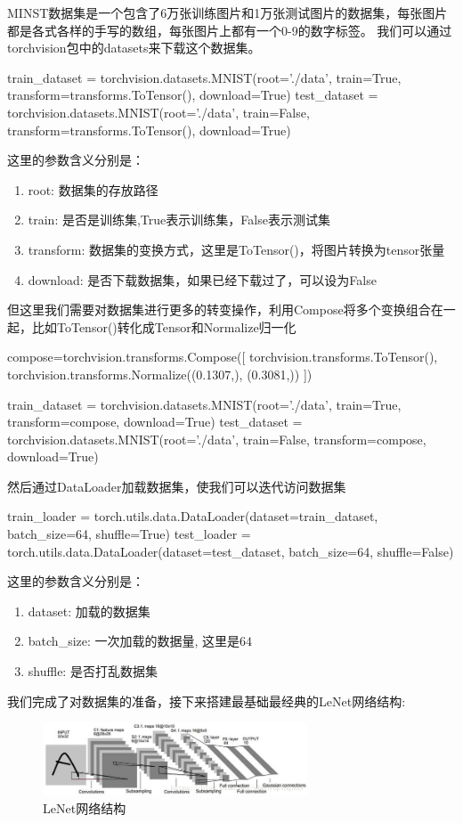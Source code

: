 MINST数据集是一个包含了6万张训练图片和1万张测试图片的数据集，每张图片都是各式各样的手写的数组，每张图片上都有一个0-9的数字标签。
我们可以通过torchvision包中的datasets来下载这个数据集。
\begin{tpython}
    train_dataset = torchvision.datasets.MNIST(root='./data', train=True, transform=transforms.ToTensor(), download=True)
    test_dataset = torchvision.datasets.MNIST(root='./data', train=False, transform=transforms.ToTensor(), download=True)
\end{tpython}
这里的参数含义分别是：
\begin{enumerate}
    \item root: 数据集的存放路径
    \item train: 是否是训练集,True表示训练集，False表示测试集
    \item transform: 数据集的变换方式，这里是ToTensor()，将图片转换为tensor张量
    \item download: 是否下载数据集，如果已经下载过了，可以设为False
\end{enumerate}

但这里我们需要对数据集进行更多的转变操作，利用Compose将多个变换组合在一起，比如ToTensor()转化成Tensor和Normalize归一化
\begin{tpython}
    compose=torchvision.transforms.Compose([
        torchvision.transforms.ToTensor(),
        torchvision.transforms.Normalize((0.1307,), (0.3081,))
    ])

    train_dataset = torchvision.datasets.MNIST(root='./data', train=True, transform=compose, download=True)
    test_dataset = torchvision.datasets.MNIST(root='./data', train=False, transform=compose, download=True)
\end{tpython}

然后通过DataLoader加载数据集，使我们可以迭代访问数据集
\begin{tpython}
    train_loader = torch.utils.data.DataLoader(dataset=train_dataset, batch_size=64, shuffle=True)
    test_loader = torch.utils.data.DataLoader(dataset=test_dataset, batch_size=64, shuffle=False)
\end{tpython}
这里的参数含义分别是：
\begin{enumerate}
    \item dataset: 加载的数据集
    \item batch\_size: 一次加载的数据量, 这里是$64$
    \item shuffle: 是否打乱数据集
\end{enumerate}

我们完成了对数据集的准备，接下来搭建最基础最经典的LeNet网络结构:
\begin{figure}[H]
    \centering
    \includegraphics[width=0.7\textwidth]{images/LeNet.png}
    \caption{LeNet网络结构}
    \label{fig:LeNet}
\end{figure}

